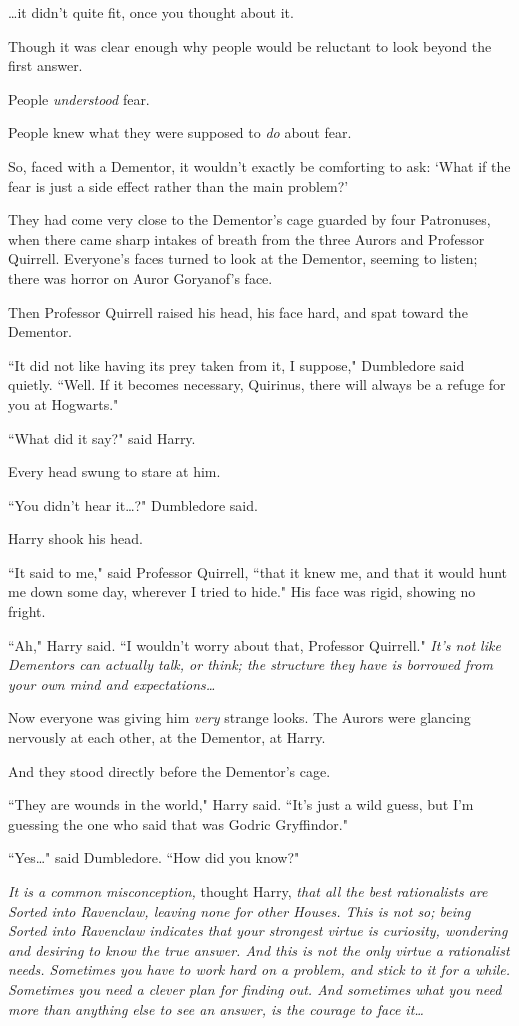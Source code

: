 {\ldots}it didn't quite fit, once you thought about it.

Though it was clear enough why people would be reluctant to look beyond the first answer.

People \emph{understood} fear.

People knew what they were supposed to \emph{do} about fear.

So, faced with a Dementor, it wouldn't exactly be comforting to ask: `What if the fear is just a side effect rather than the main problem?'

They had come very close to the Dementor's cage guarded by four Patronuses, when there came sharp intakes of breath from the three Aurors and Professor Quirrell. Everyone's faces turned to look at the Dementor, seeming to listen; there was horror on Auror Goryanof's face.

Then Professor Quirrell raised his head, his face hard, and spat toward the Dementor.

``It did not like having its prey taken from it, I suppose," Dumbledore said quietly. ``Well. If it becomes necessary, Quirinus, there will always be a refuge for you at Hogwarts."

``What did it say?" said Harry.

Every head swung to stare at him.

``You didn't hear it{\ldots}?" Dumbledore said.

Harry shook his head.

``It said to me," said Professor Quirrell, ``that it knew me, and that it would hunt me down some day, wherever I tried to hide." His face was rigid, showing no fright.

``Ah," Harry said. ``I wouldn't worry about that, Professor Quirrell." \emph{It's not like Dementors can actually talk, or think; the structure they have is borrowed from your own mind and expectations{\ldots}}

Now everyone was giving him \emph{very} strange looks. The Aurors were glancing nervously at each other, at the Dementor, at Harry.

And they stood directly before the Dementor's cage.

``They are wounds in the world," Harry said. ``It's just a wild guess, but I'm guessing the one who said that was Godric Gryffindor."

``Yes{\ldots}" said Dumbledore. ``How did you know?"

\emph{It is a common misconception,} thought Harry, \emph{that all the best rationalists are Sorted into Ravenclaw, leaving none for other Houses. This is not so; being Sorted into Ravenclaw indicates that your strongest virtue is curiosity, wondering and desiring to know the true answer. And this is not the \emph{only} virtue a rationalist needs. Sometimes you have to work hard on a problem, and stick to it for a while. Sometimes you need a clever plan for finding out. And sometimes what you need more than anything else to see an answer, is the courage to face it{\ldots}}

